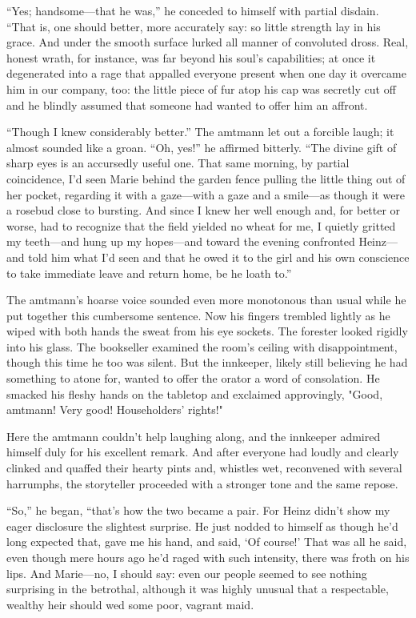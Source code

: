\documentclass[12pt,a4paper]{article}
\begin{document}
“Yes; handsome—that he was,” he conceded to himself with partial disdain. “That is, one should better, more accurately say: so little strength lay in his grace. And under the smooth surface lurked all manner of convoluted dross. Real, honest wrath, for instance, was far beyond his soul’s capabilities; at once it degenerated into a rage that appalled everyone present when one day it overcame him in our company, too: the little piece of fur atop his cap was secretly cut off and he blindly assumed that someone had wanted to offer him an affront.

“Though I knew considerably better.” The amtmann let out a forcible laugh; it almost sounded like a groan. “Oh, yes!” he affirmed bitterly. “The divine gift of sharp eyes is an accursedly useful one. That same morning, by partial coincidence, I’d seen Marie behind the garden fence pulling the little thing out of her pocket, regarding it with a gaze—with a gaze and a smile—as though it were a rosebud close to bursting. And since I knew her well enough and, for better or worse, had to recognize that the field yielded no wheat for me, I quietly gritted my teeth—and hung up my hopes—and toward the evening confronted Heinz—and told him what I’d seen and that he owed it to the girl and his own conscience to take immediate leave and return home, be he loath to.”

The amtmann’s hoarse voice sounded even more monotonous than usual while he put together this cumbersome sentence. Now his fingers trembled lightly as he wiped with both hands the sweat from his eye sockets. The forester looked rigidly into his glass. The bookseller examined the room’s ceiling with disappointment, though this time he too was silent. But the innkeeper, likely still believing he had something to atone for, wanted to offer the orator a word of consolation. He smacked his fleshy hands on the tabletop and exclaimed approvingly, "Good, amtmann! Very good! Householders’ rights!"

Here the amtmann couldn’t help laughing along, and the innkeeper admired himself duly for his excellent remark. And after everyone had loudly and clearly clinked and quaffed their hearty pints and, whistles wet, reconvened with several harrumphs, the storyteller proceeded with a stronger tone and the same repose.

“So,” he began, “that’s how the two became a pair. For Heinz didn’t show my eager disclosure the slightest surprise. He just nodded to himself as though he’d long expected that, gave me his hand, and said, ‘Of course!’ That was all he said, even though mere hours ago he’d raged with such intensity, there was froth on his lips. And Marie—no, I should say: even our people seemed to see nothing surprising in the betrothal, although it was highly unusual that a respectable, wealthy heir should wed some poor, vagrant maid.
\end{document}
